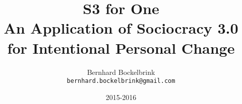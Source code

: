 \documentclass[a5paper]{scrreprt}
\begin{document}
	\title{S3 for One\\An Application of Sociocracy 3.0 for Intentional Personal Change}
	\author{Bernhard Bockelbrink\\
		\texttt{bernhard.bockelbrink@gmail.com}}
	\date{2015-2016}
	\maketitle
	
	\newpage

	\setcounter{tocdepth}{0}
	\tableofcontents
	\setcounter{tocdepth}{1}

	\newpage
    
    
\end{document}

